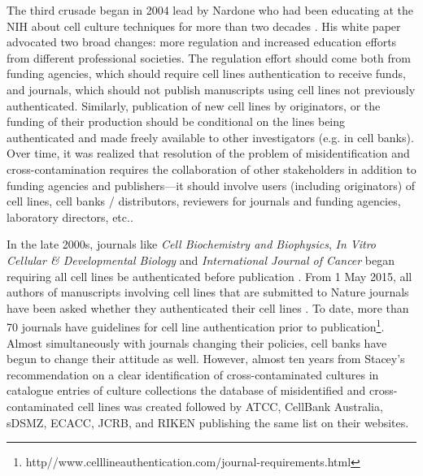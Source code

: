 \documentclass[12pt]{article}
\begin{document}
The third crusade began in 2004 lead by Nardone\added{,} who had been educating at the NIH about cell culture techniques for more than two decades \cite{nardone2007eradication}. His white paper advocated two broad changes: more regulation and increased education efforts from different professional societies. The regulation effort should come both from funding agencies, which should require cell lines authentication to receive funds, and journals, which should not publish manuscripts using cell lines not previously authenticated. Similarly, publication of new cell lines by originators, or the funding of their production should be conditional on the lines being authenticated and made freely available to other investigators (e.g. in cell banks). Over time, it was realized that resolution of the problem of misidentification and cross-contamination requires the collaboration of other stakeholders in addition to funding agencies and publishers---it should involve users (including originators) of cell lines, cell banks / distributors, reviewers for journals and funding agencies, laboratory directors, etc.. 

In the late 2000s, journals like \textit{Cell Biochemistry and Biophysics}, \textit{In Vitro Cellular \& Developmental Biology} and \textit{International Journal of Cancer} began requiring all cell lines be authenticated before publication \cite{american2010cell}. From 1 May 2015, all authors of manuscripts involving cell lines that are submitted to Nature journals have been asked whether they authenticated their cell lines \cite{editorial2015time}. To date, more than 70 journals have guidelines for cell line authentication prior to publication\footnote{http//www.celllineauthentication.com/journal-requirements.html}. Almost simultaneously with journals changing their policies, cell banks have begun to change their attitude as well. However,  almost ten years\added{,} from Stacey's recommendation on a clear identification of cross-contaminated cultures in catalogue entries of culture collections \cite{stacey2000cell}\added{,}  the database of misidentified and cross-contaminated cell lines was created  \cite{capes2010check} followed by ATCC, CellBank Australia, sDSMZ, ECACC, JCRB, and RIKEN publishing the same list on their websites.
\end{document}
